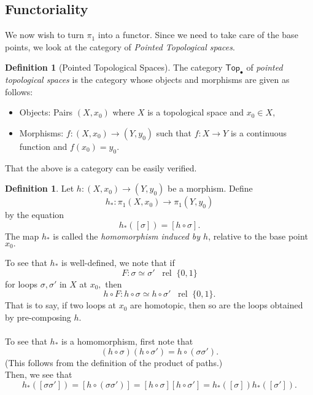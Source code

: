 \documentclass[12pt]{article}
\theoremstyle{definition}
\numberwithin{thm}{section}
\newtheorem{defn}[thm]{Definition}
\newcommand{\rel}{\;\;\operatorname{rel}\;}
\begin{document}
\subsection{Functoriality}
We now wish to turn $\pi_1$ into a functor. Since we need to take care of the base points, we look at the category of \emph{Pointed Topological spaces}.
\begin{defn}[Pointed Topological Spaces]
	The category $\mathsf{Top}_\bullet$ of \emph{pointed topological spaces} is the category whose objects and morphisms are given as follows:
	\begin{itemize}
		\item Objects: Pairs $(X, x_0)$ where $X$ is a topological space and $x_0 \in X,$
		\item Morphisms: $f:(X, x_0) \to (Y, y_0)$ such that $f:X\to Y$ is a continuous function and $f(x_0) = y_0.$
	\end{itemize}
\end{defn}
That the above is a category can be easily verified.

\begin{defn}
	Let $h:(X, x_0) \to (Y, y_0)$ be a morphism. Define
	\begin{equation*} 
		h_* : \pi_1(X, x_0) \to \pi_1(Y, y_0)
	\end{equation*}
	by the equation
	\begin{equation*} 
		h_*([\sigma]) = [h\circ \sigma].
	\end{equation*}
	The map $h_*$ is called the \emph{homomorphism induced by $h$}, relative to the base point $x_0.$
\end{defn}
To see that $h_*$ is well-defined, we note that if 
\begin{equation*} 
	F : \sigma \simeq \sigma' \rel \{0, 1\}
\end{equation*}
for loops $\sigma, \sigma'$ in $X$ at $x_0,$ then
\begin{equation*} 
	h \circ F : h\circ \sigma \simeq h\circ\sigma' \rel \{0, 1\}.
\end{equation*}
That is to say, if two loops at $x_0$ are homotopic, then so are the loops obtained by pre-composing $h.$\\~\\
To see that $h_*$ is a homomorphism, first note that
\begin{equation*} 
	(h \circ \sigma)(h \circ \sigma') = h\circ(\sigma\sigma').
\end{equation*}
(This follows from the definition of the product of paths.)\\
Then, we see that
\begin{equation*} 
	h_*([\sigma\sigma']) = [h\circ(\sigma\sigma')] = [h\circ\sigma][h\circ\sigma'] = h_*([\sigma])h_*([\sigma']).
\end{equation*}
\end{document}
